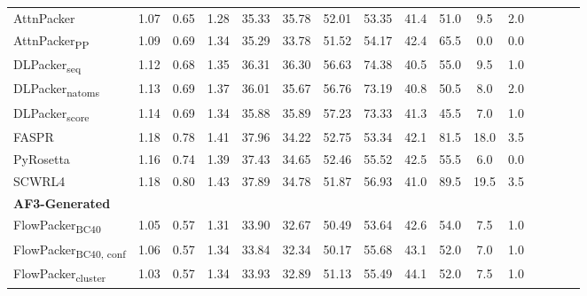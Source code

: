 \begin{table}
{\begin{tabular}{@{}lccccccccccccccc@{}}
                \textnormal{\hspace{0.5cm}AttnPacker} & 1.07 & 0.65 & 1.28 & 35.33 & 35.78 & 52.01 & 53.35 & 41.4 & 51.0 & 9.5 & 2.0 \\
                \textnormal{\hspace{0.5cm}AttnPacker\textsubscript{PP}} & 1.09 & 0.69 & 1.34 & 35.29 & 33.78 & 51.52 & 54.17 & 42.4 & 65.5 & 0.0 & 0.0 \\
                \textnormal{\hspace{0.5cm}DLPacker\textsubscript{seq}} & 1.12 & 0.68 & 1.35 & 36.31 & 36.30 & 56.63 & 74.38 & 40.5 & 55.0 & 9.5 & 1.0 \\
                \textnormal{\hspace{0.5cm}DLPacker\textsubscript{natoms}} & 1.13 & 0.69 & 1.37 & 36.01 & 35.67 & 56.76 & 73.19 & 40.8 & 50.5 & 8.0 & 2.0 \\
                \textnormal{\hspace{0.5cm}DLPacker\textsubscript{score}} & 1.14 & 0.69 & 1.34 & 35.88 & 35.89 & 57.23 & 73.33 & 41.3 & 45.5 & 7.0 & 1.0 \\
                \textnormal{\hspace{0.5cm}FASPR} & 1.18 & 0.78 & 1.41 & 37.96 & 34.22 & 52.75 & 53.34 & 42.1 & 81.5 & 18.0 & 3.5 \\
                \textnormal{\hspace{0.5cm}PyRosetta} & 1.16 & 0.74 & 1.39 & 37.43 & 34.65 & 52.46 & 55.52 & 42.5 & 55.5 & 6.0 & 0.0 \\
                \textnormal{\hspace{0.5cm}SCWRL4} & 1.18 & 0.80 & 1.43 & 37.89 & 34.78 & 51.87 & 56.93 & 41.0 & 89.5 & 19.5 & 3.5 \\
            \textbf{AF3-Generated} & & & & & & & & & \\ 
                \textnormal{\hspace{0.5cm}FlowPacker\textsubscript{BC40}} & 1.05 & 0.57 & 1.31 & 33.90 & 32.67 & 50.49 & 53.64 & 42.6 & 54.0 & 7.5 & 1.0 \\
                \textnormal{\hspace{0.5cm}FlowPacker\textsubscript{BC40, conf}} & 1.06 & 0.57 & 1.34 & 33.84 & 32.34 & 50.17 & 55.68 & 43.1 & 52.0 & 7.0 & 1.0 \\
                \textnormal{\hspace{0.5cm}FlowPacker\textsubscript{cluster}} & 1.03 & 0.57 & 1.34 & 33.93 & 32.89 & 51.13 & 55.49 & 44.1 & 52.0 & 7.5 & 1.0 \\

\end{tabular}}
\end{table}
